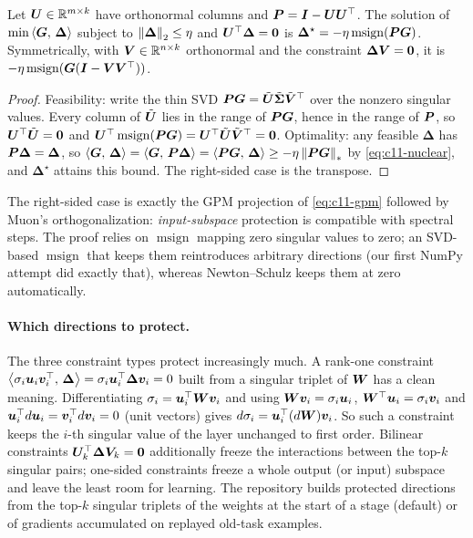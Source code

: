 \begin{proposition}\label{prop:c11-onesided}
Let $\bm{U} \in \mathbb{R}^{m\times k}$ have orthonormal columns and $\bm{P} = \bm{I} - \bm{U}\bm{U}^{\top}$. The solution of
$\min\left\langle \bm{G},\, \bm{\Delta}\right\rangle$ subject to $\left\lVert \bm{\Delta}\right\rVert_2 \le \eta$ and $\bm{U}^{\top}\bm{\Delta} = \bm{0}$ is
$\bm{\Delta}^\star = -\eta\operatorname{msign}(\bm{P}\bm{G})$. Symmetrically, with $\bm{V} \in \mathbb{R}^{n\times k}$
orthonormal and the constraint $\bm{\Delta}\bm{V} = \bm{0}$, it is $-\eta\operatorname{msign}(\bm{G}(\bm{I} - \bm{V}\bm{V}^{\top}))$.
\end{proposition}
\begin{proof}
Feasibility: write the thin SVD $\bm{P}\bm{G} = \tilde{\bm{U}}\tilde{\bm{\Sigma}}\tilde{\bm{V}}^{\top}$ over the nonzero
singular values. Every column of $\tilde{\bm{U}}$ lies in the range of $\bm{P}\bm{G}$, hence in the range of
$\bm{P}$, so $\bm{U}^{\top}\tilde{\bm{U}} = \bm{0}$ and $\bm{U}^{\top}\operatorname{msign}(\bm{P}\bm{G}) = \bm{U}^{\top}\tilde{\bm{U}}\tilde{\bm{V}}^{\top} = \bm{0}$.
Optimality: any feasible $\bm{\Delta}$ has $\bm{P}\bm{\Delta} = \bm{\Delta}$, so
$\left\langle \bm{G},\, \bm{\Delta}\right\rangle = \left\langle \bm{G},\, \bm{P}\bm{\Delta}\right\rangle = \left\langle \bm{P}\bm{G},\, \bm{\Delta}\right\rangle \ge -\eta\left\lVert \bm{P}\bm{G}\right\rVert_*$ by
\cref{eq:c11-nuclear}, and $\bm{\Delta}^\star$ attains this bound. The right-sided case is the
transpose.
\end{proof}

The right-sided case is exactly the GPM projection of \cref{eq:c11-gpm} followed by Muon's
orthogonalization: \emph{input-subspace} protection is compatible with spectral steps. The proof
relies on $\operatorname{msign}$ mapping zero singular values to zero; an SVD-based
$\operatorname{msign}$ that keeps them reintroduces arbitrary directions (our first NumPy attempt
did exactly that), whereas Newton--Schulz keeps them at zero automatically.

\paragraph{Which directions to protect.} The three constraint types protect increasingly much.
A rank-one constraint $\left\langle \sigma_i\bm{u}_i\bm{v}_i^{\top},\, \bm{\Delta}\right\rangle = \sigma_i\bm{u}_i^{\top}\bm{\Delta}\bm{v}_i = 0$ built
from a singular triplet of $\bm{W}$ has a clean meaning. Differentiating $\sigma_i = \bm{u}_i^{\top}\bm{W}\bm{v}_i$
and using $\bm{W}\bm{v}_i = \sigma_i\bm{u}_i$, $\bm{W}^{\top}\bm{u}_i = \sigma_i\bm{v}_i$ and $\bm{u}_i^{\top} d\bm{u}_i = \bm{v}_i^{\top} d\bm{v}_i = 0$
(unit vectors) gives $d\sigma_i = \bm{u}_i^{\top}(d\bm{W})\bm{v}_i$. So such a constraint keeps the $i$-th
singular value of the layer unchanged to first order. Bilinear constraints $\bm{U}_k^{\top}\bm{\Delta}\bm{V}_k =
\bm{0}$ additionally freeze the interactions between the top-$k$ singular pairs; one-sided constraints
freeze a whole output (or input) subspace and leave the least room for learning. The repository
builds protected directions from the top-$k$ singular triplets of the weights at the start of a
stage (default) or of gradients accumulated on replayed old-task examples.

